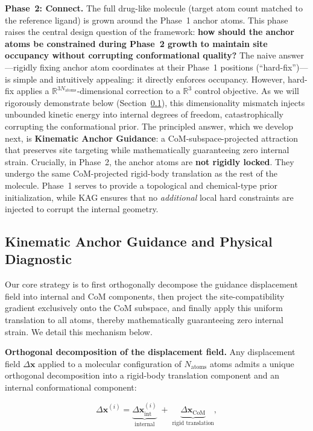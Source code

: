 \documentclass{article}
\newcommand{\reals}{\ensuremath{\mathbb{R}}}
\newcommand{\Deltax}{\ensuremath{\Delta\bm{x}}}
\begin{document}
\textbf{Phase~2: Connect.}
The full drug-like molecule (target atom count matched to the reference
ligand) is grown around the Phase~1 anchor atoms.  This phase raises the
central design question of the framework: \textbf{how should the anchor atoms
be constrained during Phase~2 growth to maintain site occupancy without
corrupting conformational quality?}  The naive answer---rigidly fixing anchor
atom coordinates at their Phase~1 positions (``hard-fix'')---is simple and
intuitively appealing: it directly enforces occupancy.  However, hard-fix
applies a $\reals^{3N_{\text{atoms}}}$-dimensional correction to a
$\reals^3$ control objective.  As we will rigorously demonstrate below
(Section~\ref{sec:kinematic}), this dimensionality mismatch injects unbounded
kinetic energy into internal degrees of freedom, catastrophically corrupting
the conformational prior.  The principled answer, which we develop next, is
\textbf{Kinematic Anchor Guidance}: a CoM-subspace-projected attraction that
preserves site targeting while mathematically guaranteeing zero internal
strain.  Crucially, in Phase~2, the anchor atoms are \textbf{not rigidly
locked}.  They undergo the same CoM-projected rigid-body translation as
the rest of the molecule.  Phase~1 serves to provide a topological and
chemical-type prior initialization, while KAG ensures that no
\emph{additional} local hard constraints are injected to corrupt the
internal geometry.

\subsection{Kinematic Anchor Guidance and Physical Diagnostic}
\label{sec:kinematic}

Our core strategy is to first orthogonally decompose the guidance displacement
field into internal and CoM components, then project the site-compatibility
gradient exclusively onto the CoM subspace, and finally apply this uniform
translation to all atoms, thereby mathematically guaranteeing zero internal
strain.  We detail this mechanism below.

\textbf{Orthogonal decomposition of the displacement field.}
Any displacement field $\Deltax$ applied to a molecular configuration of
$N_{\text{atoms}}$ atoms admits a unique orthogonal decomposition into a
rigid-body translation component and an internal conformational component:

\begin{equation}\label{eq:svflow_decomp}
\Deltax^{(i)} = \underbrace{\Deltax_{\text{int}}^{(i)}}_{\text{internal}} \;+\;
                \underbrace{\Deltax_{\text{CoM}}}_{\text{rigid translation}},
\end{equation}
\end{document}
